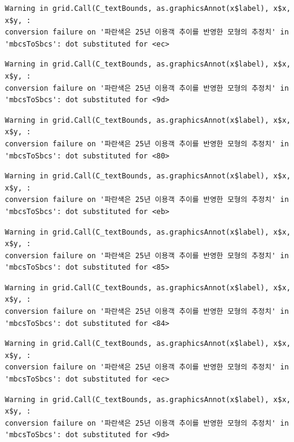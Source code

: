 \documentclass[
  letterpaper,
  DIV=11,
  numbers=noendperiod]{scrreprt}
\begin{document}
\begin{verbatim}
Warning in grid.Call(C_textBounds, as.graphicsAnnot(x$label), x$x, x$y, :
conversion failure on '파란색은 25년 이용객 추이를 반영한 모형의 추정치' in
'mbcsToSbcs': dot substituted for <ec>
\end{verbatim}

\begin{verbatim}
Warning in grid.Call(C_textBounds, as.graphicsAnnot(x$label), x$x, x$y, :
conversion failure on '파란색은 25년 이용객 추이를 반영한 모형의 추정치' in
'mbcsToSbcs': dot substituted for <9d>
\end{verbatim}

\begin{verbatim}
Warning in grid.Call(C_textBounds, as.graphicsAnnot(x$label), x$x, x$y, :
conversion failure on '파란색은 25년 이용객 추이를 반영한 모형의 추정치' in
'mbcsToSbcs': dot substituted for <80>
\end{verbatim}

\begin{verbatim}
Warning in grid.Call(C_textBounds, as.graphicsAnnot(x$label), x$x, x$y, :
conversion failure on '파란색은 25년 이용객 추이를 반영한 모형의 추정치' in
'mbcsToSbcs': dot substituted for <eb>
\end{verbatim}

\begin{verbatim}
Warning in grid.Call(C_textBounds, as.graphicsAnnot(x$label), x$x, x$y, :
conversion failure on '파란색은 25년 이용객 추이를 반영한 모형의 추정치' in
'mbcsToSbcs': dot substituted for <85>
\end{verbatim}

\begin{verbatim}
Warning in grid.Call(C_textBounds, as.graphicsAnnot(x$label), x$x, x$y, :
conversion failure on '파란색은 25년 이용객 추이를 반영한 모형의 추정치' in
'mbcsToSbcs': dot substituted for <84>
\end{verbatim}

\begin{verbatim}
Warning in grid.Call(C_textBounds, as.graphicsAnnot(x$label), x$x, x$y, :
conversion failure on '파란색은 25년 이용객 추이를 반영한 모형의 추정치' in
'mbcsToSbcs': dot substituted for <ec>
\end{verbatim}

\begin{verbatim}
Warning in grid.Call(C_textBounds, as.graphicsAnnot(x$label), x$x, x$y, :
conversion failure on '파란색은 25년 이용객 추이를 반영한 모형의 추정치' in
'mbcsToSbcs': dot substituted for <9d>
\end{verbatim}
\end{document}
